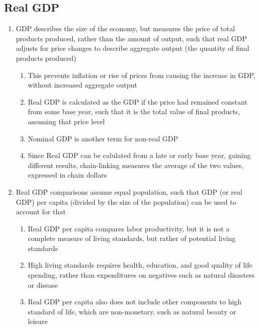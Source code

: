 \documentclass[11 pt, twoside]{article}
\begin{document}
\subsection{Real GDP}
\begin{enumerate}
\item GDP describes the size of the economy, but measures the price of total products produced, rather than the amount of output, such that real GDP adjusts for price changes to describe aggregate output (the quantity of final products produced)
\begin{enumerate}
\item This prevents inflation or rise of prices from causing the increase in GDP, without increased aggregate output
\item Real GDP is calculated as the GDP if the price had remained constant from some base year, such that it is the total value of final products, assuming that price level
\item Nominal GDP is another term for non-real GDP
\item Since Real GDP can be calulated from a late or early base year, gaining different results, chain-linking measures the average of the two values, expressed in chain dollars
\end{enumerate}
\item Real GDP comparisons assume equal population, such that GDP (or real GDP) per capita (divided by the size of the population) can be used to account for that
\begin{enumerate}
\item Real GDP per capita compares labor productivity, but it is not a complete measure of living standards, but rather of potential living standards
\item High living standards requires health, education, and good quality of life spending, rather than expenditures on negatives such as natural disasters or disease
\item Real GDP per capita also does not include other components to high standard of life, which are non-monetary, such as natural beauty or leisure
\end{enumerate}
\end{enumerate}
\end{document}
